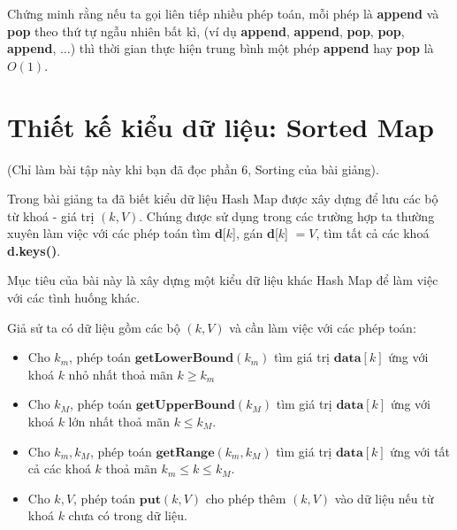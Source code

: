 \documentclass{article}
\begin{document}
\begin{em}
        Chứng minh rằng nếu ta gọi liên tiếp nhiều phép toán, mỗi phép là \textbf{append} và \textbf{pop} theo thứ tự ngẫu nhiên bất kì, (ví dụ \textbf{append}, \textbf{append}, \textbf{pop}, \textbf{pop}, \textbf{append}, $\ldots$) thì thời gian thực hiện trung bình một phép \textbf{append} hay \textbf{pop} là $O(1)$. 
\end{em}

\section{Thiết kế kiểu dữ liệu: Sorted Map}

(Chỉ làm bài tập này khi bạn đã đọc phần 6, Sorting của bài giảng).

Trong bài giảng ta đã biết kiểu dữ liệu Hash Map được xây dựng để lưu các bộ từ khoá - giá trị $(k, V)$. Chúng được sử dụng trong các trường hợp ta thường xuyên làm việc với các phép toán tìm \textbf{d}[$k$], gán \textbf{d}[$k$] $=V$, tìm tất cả các khoá \textbf{d.keys()}.

Mục tiêu của bài này là xây dựng một kiểu dữ liệu khác Hash Map để làm việc với các tình huống khác.

Giả sử ta có dữ liệu gồm các bộ $(k, V)$ và cần làm việc với các phép toán:
\begin{itemize}
    \item Cho $k_m$, phép toán $\textbf{getLowerBound}(k_m)$ tìm giá trị $\textbf{data}[k]$ ứng với khoá $k$ nhỏ nhất thoả mãn $k \geq k_m$
    \item Cho $k_M$, phép toán $\textbf{getUpperBound}(k_M)$ tìm giá trị $\textbf{data}[k]$ ứng với khoá $k$ lớn nhất thoả mãn $k \leq k_M$. 
    \item Cho $k_m, k_M$, phép toán $\textbf{getRange}(k_m, k_M)$ tìm giá trị $\textbf{data}[k]$ ứng với tất cả các khoá $k$ thoả mãn $k_m \leq k \leq k_M$.
    \item Cho $k, V$, phép toán $\textbf{put}(k, V)$ cho phép thêm $(k, V)$ vào dữ liệu nếu từ khoá $k$ chưa có trong dữ liệu.

\end{itemize}{}
\end{document}
